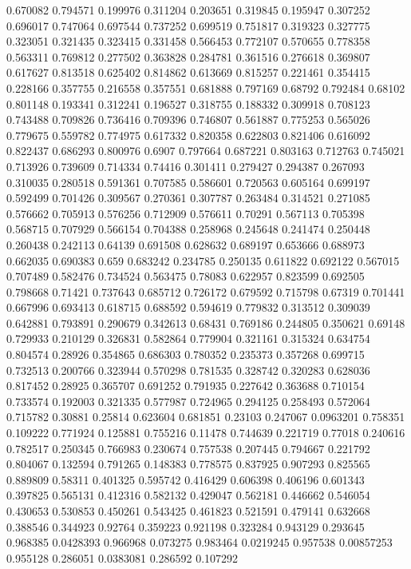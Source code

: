 0.670082 0.794571
0.199976 0.311204
0.203651 0.319845
0.195947 0.307252
0.696017 0.747064
0.697544 0.737252
0.699519 0.751817
0.319323 0.327775
0.323051 0.321435
0.323415 0.331458
0.566453 0.772107
0.570655 0.778358
0.563311 0.769812
0.277502 0.363828
0.284781 0.361516
0.276618 0.369807
0.617627 0.813518
0.625402 0.814862
0.613669 0.815257
0.221461 0.354415
0.228166 0.357755
0.216558 0.357551
0.681888 0.797169
0.68792 0.792484
0.68102 0.801148
0.193341 0.312241
0.196527 0.318755
0.188332 0.309918
0.708123 0.743488
0.709826 0.736416
0.709396 0.746807
0.561887 0.775253
0.565026 0.779675
0.559782 0.774975
0.617332 0.820358
0.622803 0.821406
0.616092 0.822437
0.686293 0.800976
0.6907 0.797664
0.687221 0.803163
0.712763 0.745021
0.713926 0.739609
0.714334 0.74416
0.301411 0.279427
0.294387 0.267093
0.310035 0.280518
0.591361 0.707585
0.586601 0.720563
0.605164 0.699197
0.592499 0.701426
0.309567 0.270361
0.307787 0.263484
0.314521 0.271085
0.576662 0.705913
0.576256 0.712909
0.576611 0.70291
0.567113 0.705398
0.568715 0.707929
0.566154 0.704388
0.258968 0.245648
0.241474 0.250448
0.260438 0.242113
0.64139 0.691508
0.628632 0.689197
0.653666 0.688973
0.662035 0.690383
0.659 0.683242
0.234785 0.250135
0.611822 0.692122
0.567015 0.707489
0.582476 0.734524
0.563475 0.78083
0.622957 0.823599
0.692505 0.798668
0.71421 0.737643
0.685712 0.726172
0.679592 0.715798
0.67319 0.701441
0.667996 0.693413
0.618715 0.688592
0.594619 0.779832
0.313512 0.309039
0.642881 0.793891
0.290679 0.342613
0.68431 0.769186
0.244805 0.350621
0.69148 0.729933
0.210129 0.326831
0.582864 0.779904
0.321161 0.315324
0.634754 0.804574
0.28926 0.354865
0.686303 0.780352
0.235373 0.357268
0.699715 0.732513
0.200766 0.323944
0.570298 0.781535
0.328742 0.320283
0.628036 0.817452
0.28925 0.365707
0.691252 0.791935
0.227642 0.363688
0.710154 0.733574
0.192003 0.321335
0.577987 0.724965
0.294125 0.258493
0.572064 0.715782
0.30881 0.25814
0.623604 0.681851
0.23103 0.247067
0.0963201 0.758351
0.109222 0.771924
0.125881 0.755216
0.11478 0.744639
0.221719 0.77018
0.240616 0.782517
0.250345 0.766983
0.230674 0.757538
0.207445 0.794667
0.221792 0.804067
0.132594 0.791265
0.148383 0.778575
0.837925 0.907293
0.825565 0.889809
0.58311 0.401325
0.595742 0.416429
0.606398 0.406196
0.601343 0.397825
0.565131 0.412316
0.582132 0.429047
0.562181 0.446662
0.546054 0.430653
0.530853 0.450261
0.543425 0.461823
0.521591 0.479141
0.632668 0.388546
0.344923 0.92764
0.359223 0.921198
0.323284 0.943129
0.293645 0.968385
0.0428393 0.966968
0.073275 0.983464
0.0219245 0.957538
0.00857253 0.955128
0.286051 0.0383081
0.286592 0.107292
